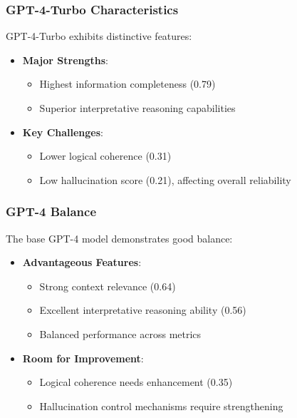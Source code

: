 \subsubsection{GPT-4-Turbo Characteristics}
GPT-4-Turbo exhibits distinctive features:
\begin{itemize}
    \item \textbf{Major Strengths}:
    \begin{itemize}
        \item Highest information completeness (0.79)
        \item Superior interpretative reasoning capabilities
    \end{itemize}
    \vspace{0.5em}
    \item \textbf{Key Challenges}:
    \begin{itemize}
        \item Lower logical coherence (0.31)
        \item Low hallucination score (0.21), affecting overall reliability
    \end{itemize}
\end{itemize}

\vspace{0.5em}
\subsubsection{GPT-4 Balance}
The base GPT-4 model demonstrates good balance:
\begin{itemize}
    \item \textbf{Advantageous Features}:
    \begin{itemize}
        \item Strong context relevance (0.64)
        \item Excellent interpretative reasoning ability (0.56)
        \item Balanced performance across metrics
    \end{itemize}
    \vspace{0.5em}
    \item \textbf{Room for Improvement}:
    \begin{itemize}
        \item Logical coherence needs enhancement (0.35)
        \item Hallucination control mechanisms require strengthening
    \end{itemize}
\end{itemize}

